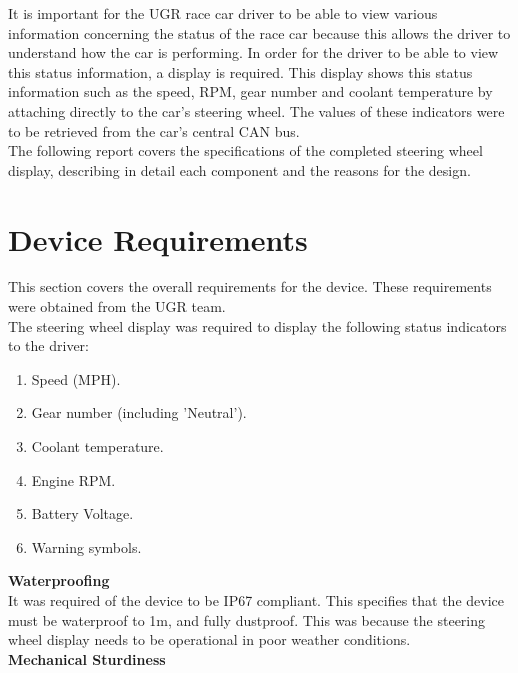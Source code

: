 \documentclass[a4paper,12pt]{article}
\begin{document}
It is important for the UGR race car driver to be able to view various information concerning the status of the race car because this allows the driver to understand how the car is performing. In order for the driver to be able to view this status information, a display is required. This display shows this status information such as the speed, RPM, gear number and coolant temperature by attaching directly to the car’s steering wheel. The values of these indicators were to be retrieved from the car’s central CAN bus. \\

The following report covers the specifications of the completed steering wheel display, describing in detail each component and the reasons for the design.


\newpage
\section{Device Requirements}
\label{sec:device_requirements}

This section covers the overall requirements for the device. These requirements were obtained from the UGR team. \\

The steering wheel display was required to display the following status indicators to the driver:

\begin{enumerate}
  \item Speed (MPH).
  \item Gear number (including 'Neutral').
  \item Coolant temperature.
  \item Engine RPM.
  \item Battery Voltage.
  \item Warning symbols.
\end{enumerate}

\textbf{Waterproofing} \\

It was required of the device to be IP67 compliant. This specifies that the device must be waterproof to 1m, and fully dustproof. This was because the steering wheel display needs to be operational in poor weather conditions. \\

\textbf{Mechanical Sturdiness} \\
\end{document}
